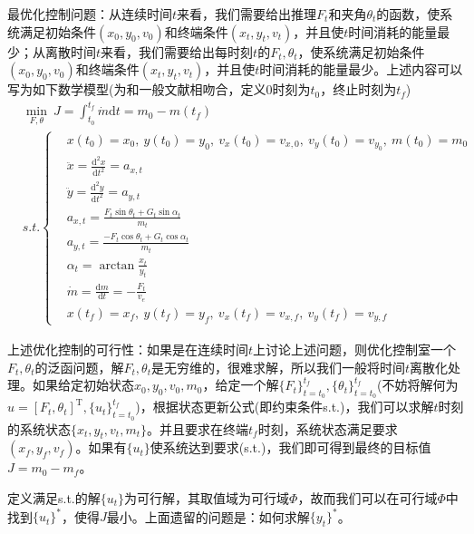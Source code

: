             \par
            最优化控制问题：从连续时间$t$来看，我们需要给出推理$F_t$和夹角$\theta_t$的函数，使系统满足初始条件$(x_0,y_0,v_0)$和终端条件$(x_t,y_t,v_t)$，并且使$t$时间消耗的能量最少；从离散时间$t$来看，我们需要给出每时刻$t$的$F_t,\theta_t$，使系统满足初始条件$(x_0,y_0,v_0)$和终端条件$(x_t,y_t,v_t)$，并且使$t$时间消耗的能量最少。上述内容可以写为如下数学模型(为和一般文献相吻合，定义0时刻为$t_0$，终止时刻为$t_f$)
            \begin{align*}
            & \min _{F,\theta} \ J = \int_{t_0}^{t_f}\dot{m}\mathrm{d}t = m_0 - m(t_f)\\
            & s.t.\left\{
            \begin{aligned}
            &x(t_0) = x_0,\ y(t_0) = y_0, \ v_x(t_0) = v_{x,0},\ v_y(t_0) = v_{y_0}, \ m(t_0) = m_0\\
            &\ddot{x} = \frac{\mathrm{d}^2x}{\mathrm{d}t^2} = a_{x,t}\\
            &\ddot{y} = \frac{\mathrm{d}^2y}{\mathrm{d}t^2} = a_{y,t}\\
            & a_{x,t} = \frac{F_t\sin \theta_t+G_t\sin \alpha_t}{m_t}\\
            & a_{y,t} = \frac{-F_t\cos \theta_t+G_t\cos \alpha_t}{m_t}\\
            &\alpha_t = \arctan\frac{x_t}{y_t}\\
            & \dot{m} = \frac{\mathrm{d}m}{\mathrm{d}t} = -\frac{F_t}{v_e}\\
            & x(t_f) = x_f,\ y(t_f) = y_f,\ v_x(t_f) = v_{x,f},\ v_y(t_f) = v_{y,f}
            \end{aligned}
            \right.
            \end{align*}
            \par
            上述优化控制的可行性：如果是在连续时间$t$上讨论上述问题，则优化控制室一个$F_t,\theta_t$的泛函问题，解$F_t,\theta_t$是无穷维的，很难求解，所以我们一般将时间$t$离散化处理。如果给定初始状态$x_0,y_0,v_0,m_0$，给定一个解$\{F_t\}_{t=t_0}^{t_f},\{\theta_t\}_{t=t_0}^{t_f}$(不妨将解何为$u = [F_t,\theta_t]^\mathrm{T},\{u_t\}_{t=t_0}^{t_f}$)，根据状态更新公式(即约束条件s.t.)，我们可以求解$t$时刻的系统状态$\{x_t,y_t,v_t,m_t\}$。并且要求在终端$t_f$时刻，系统状态满足要求$(x_f,y_f,v_f)$。如果有$\{u_t\}$使系统达到要求(s.t.)，我们即可得到最终的目标值$J = m_0-m_f$。
            \par
            定义满足s.t.的解$\{u_t\}$为可行解，其取值域为可行域$\Phi$，故而我们可以在可行域$\Phi$中找到$\{u_t\}^*$，使得$J$最小。上面遗留的问题是：如何求解$\{y_t\}^*$。
